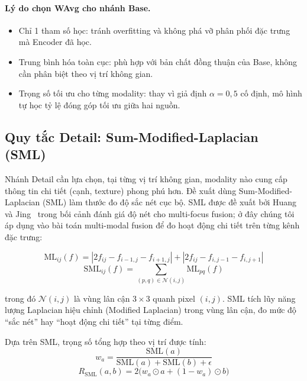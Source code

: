 \paragraph{Lý do chọn WAvg cho nhánh Base.}
\begin{itemize}\itemsep0pt
    \item Chỉ 1 tham số học: tránh overfitting và không phá vỡ phân phối đặc trưng mà Encoder đã học.
    \item Trung bình hóa toàn cục: phù hợp với bản chất đồng thuận của Base, không cần phân biệt theo vị trí không gian.
    \item Trọng số tối ưu cho từng modality: thay vì giả định $\alpha = 0{,}5$ cố định, mô hình tự học tỷ lệ đóng góp tối ưu giữa hai nguồn.
\end{itemize}

\subsection{Quy tắc Detail: Sum-Modified-Laplacian (SML)}
\label{ssec:rule-sml}

Nhánh Detail cần lựa chọn, tại từng vị trí không gian, modality nào cung cấp thông tin chi tiết (cạnh, texture) phong phú hơn. Đề xuất dùng Sum-Modified-Laplacian (SML) làm thước đo độ sắc nét cục bộ. SML được đề xuất bởi Huang và Jing~\cite{huang2007sml} trong bối cảnh đánh giá độ nét cho multi-focus fusion; ở đây chúng tôi áp dụng vào bài toán multi-modal fusion để đo hoạt động chi tiết trên từng kênh đặc trưng:

\begin{equation}
\mathrm{ML}_{ij}(f) = |2f_{ij} - f_{i-1,j} - f_{i+1,j}| + |2f_{ij} - f_{i,j-1} - f_{i,j+1}|
\label{eq:ml}
\end{equation}
\begin{equation}
\mathrm{SML}_{ij}(f) = \sum_{(p,q) \in \mathcal{N}(i,j)} \mathrm{ML}_{pq}(f)
\label{eq:sml}
\end{equation}

trong đó $\mathcal{N}(i,j)$ là vùng lân cận $3\times 3$ quanh pixel $(i,j)$. SML tích lũy năng lượng Laplacian hiệu chỉnh (Modified Laplacian) trong vùng lân cận, đo mức độ ``sắc nét'' hay ``hoạt động chi tiết'' tại từng điểm.

Dựa trên SML, trọng số tổng hợp theo vị trí được tính:
\begin{equation}
w_a = \frac{\mathrm{SML}(a)}{\mathrm{SML}(a) + \mathrm{SML}(b) + \epsilon}
\end{equation}
\begin{equation}
R_{\mathrm{SML}}(a, b) = 2\bigl(w_a \odot a + (1 - w_a) \odot b\bigr)
\label{eq:sml-rule}
\end{equation}

